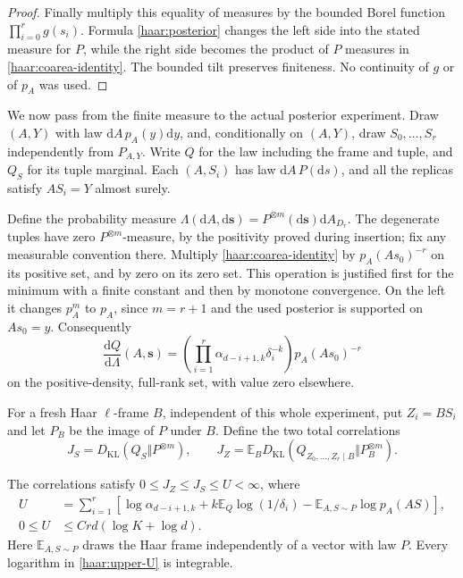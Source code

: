 \begin{proof}
Finally multiply this equality of measures by the bounded Borel function
$\prod_{i=0}^r g(s_i)$.  Formula \eqref{haar:posterior} changes the
left side into the stated measure for $P$, while the right side becomes
the product of $P$ measures in \eqref{haar:coarea-identity}.  The bounded
tilt preserves finiteness.  No continuity of $g$ or of $p_A$ was used.
\end{proof}

We now pass from the finite measure to the actual posterior experiment.
Draw $(A,Y)$ with law $\mathrm dA\,p_A(y)\mathrm dy$, and, conditionally
on $(A,Y)$, draw $S_0,\ldots,S_r$ independently from $P_{A,Y}$.  Write
$Q$ for the law including the frame and tuple, and $Q_S$ for its tuple
marginal.  Each $(A,S_i)$ has law $\mathrm dA\,P(\mathrm ds)$, and all
the replicas satisfy $AS_i=Y$ almost surely.

Define the probability measure
$\Lambda(\mathrm dA,\mathrm d\boldsymbol s)
 =P^{\otimes m}(\mathrm d\boldsymbol s)\mathrm dA_{D_r}$.
The degenerate tuples have zero
$P^{\otimes m}$-measure, by the positivity proved during insertion; fix
any measurable convention there.  Multiply
\eqref{haar:coarea-identity} by $p_A(As_0)^{-r}$ on its positive set,
and by zero on its zero set.  This operation is justified first for the
minimum with a finite constant and then by monotone convergence.  On the
left it changes $p_A^m$ to $p_A$, since $m=r+1$ and the used posterior
is supported on $As_0=y$.  Consequently
\begin{equation}\label{haar:replica-density}
 \frac{\mathrm dQ}{\mathrm d\Lambda}(A,\boldsymbol s)
 =\left(\prod_{i=1}^r\alpha_{d-i+1,k}\delta_i^{-k}\right)
       p_A(As_0)^{-r}
\end{equation}
on the positive-density, full-rank set, with value zero elsewhere.

For a fresh Haar $\ell$-frame $B$, independent of this whole experiment,
put $Z_i=BS_i$ and let $P_B$ be the image of $P$ under $B$.  Define the
two total correlations
\begin{equation}\label{haar:correlations}
 J_S=D_{\mathrm{KL}}(Q_S\Vert P^{\otimes m}),\qquad
 J_Z=\mathbb E_B D_{\mathrm{KL}}
       (Q_{Z_0,\ldots,Z_r\mid B}\Vert P_B^{\otimes m}).
\end{equation}

\begin{lemma}\label{haar:upper-correlation}
The correlations satisfy $0\le J_Z\le J_S\le U<\infty$, where
\begin{align}
 U&=\sum_{i=1}^r\left[
       \log\alpha_{d-i+1,k}+k\mathbb E_Q\log(1/\delta_i)
       -\mathbb E_{A,S\sim P}\log p_A(AS)\right],
       \label{haar:upper-U}\\
 0\le U&\le Crd(\log K+\log d).\label{haar:crude-U}
\end{align}
Here $\mathbb E_{A,S\sim P}$ draws the Haar frame independently of a
vector with law $P$.  Every logarithm in \eqref{haar:upper-U} is
integrable.
\end{lemma}

